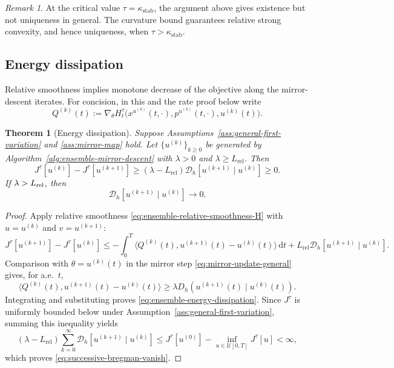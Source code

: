 \documentclass[11pt]{amsart}
\numberwithin{equation}{section} %
\newcommand{\dd}{\mathrm{d}}
\newtheorem{theorem}{Theorem}[section]
\theoremstyle{remark}
\newtheorem{remark}{Remark}[section]
\begin{document}
\begin{remark}
At the critical value $\tau=\kappa_{\mathrm{stab}}$, the argument above
gives existence but not uniqueness in general. The curvature bound guarantees relative strong convexity,
and hence uniqueness, when $\tau>\kappa_{\mathrm{stab}}$.
\end{remark}

\subsection{Energy dissipation}
\label{subsec:ensemble-energy-dissipation}

Relative smoothness implies monotone decrease of the objective along
the mirror-descent iterates. For concision, in this and the rate
proof below write
\begin{equation}
\label{eq:iterate-Hamiltonian-gradient}
Q^{(k)}(t):=\nabla_\theta H_t^\tau
\bigl(x^{u^{(k)}}(t,\cdot),p^{u^{(k)}}(t,\cdot),u^{(k)}(t)\bigr).
\end{equation}

\begin{theorem}[Energy dissipation]
\label{thm:ensemble-energy-dissipation}
Suppose Assumptions~\ref{ass:general-first-variation} and
\ref{ass:mirror-map} hold. Let $\{u^{(k)}\}_{k\ge0}$ be generated by
Algorithm~\ref{alg:ensemble-mirror-descent} with $\lambda>0$ and
$\lambda\ge L_{\mathrm{rel}}$. Then
\begin{equation}
\label{eq:ensemble-energy-dissipation}
J^\tau[u^{(k)}]-J^\tau[u^{(k+1)}]
\ge(\lambda-L_{\mathrm{rel}})
\mathcal D_h[u^{(k+1)}\mid u^{(k)}]\ge0.
\end{equation}
If $\lambda>L_{\rm rel}$, then
\begin{equation}
\label{eq:successive-bregman-vanish}
\mathcal D_h[u^{(k+1)}\mid u^{(k)}]\longrightarrow0.
\end{equation}
\end{theorem}

\begin{proof}
Apply relative smoothness \eqref{eq:ensemble-relative-smoothness-H} with $u=u^{(k)}$ and $v=u^{(k+1)}$:
\[
J^\tau[u^{(k+1)}]-J^\tau[u^{(k)}]
\le-\int_0^T\langle Q^{(k)}(t),u^{(k+1)}(t)-u^{(k)}(t)\rangle\,\dd t
+L_{\mathrm{rel}}\mathcal D_h[u^{(k+1)}\mid u^{(k)}].
\]
Comparison with $\theta=u^{(k)}(t)$ in the mirror step \eqref{eq:mirror-update-general} gives, for
a.e.\ $t$,
\[
\langle Q^{(k)}(t),u^{(k+1)}(t)-u^{(k)}(t)\rangle
\ge\lambda D_h(u^{(k+1)}(t)\mid u^{(k)}(t)).
\]
Integrating and substituting proves \eqref{eq:ensemble-energy-dissipation}.
Since $J^\tau$ is uniformly bounded below under Assumption~\ref{ass:general-first-variation},
summing this inequality yields
\[
(\lambda-L_{\mathrm{rel}})\sum_{k=0}^\infty
\mathcal D_h[u^{(k+1)}\mid u^{(k)}]
\le J^\tau[u^{(0)}]-\inf_{u\in\mathcal U[0,T]}J^\tau[u]<\infty,
\]
which proves \eqref{eq:successive-bregman-vanish}.
\end{proof}
\end{document}
